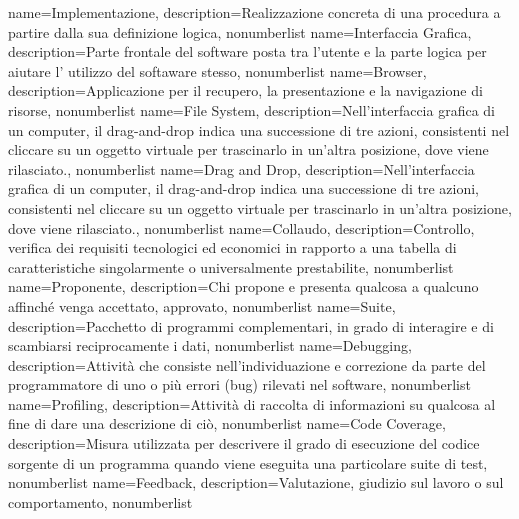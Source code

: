\usepackage{glossaries}
\usepackage[utf8x]{inputenc}
\usepackage[italian]{babel}

\makeglossaries

{
	name={Implementazione},
	description={Realizzazione concreta di una procedura a partire dalla sua definizione logica},
	nonumberlist 
}
{
name={Interfaccia Grafica},
description={Parte frontale del software posta tra l'utente e la parte logica per aiutare l' utilizzo del softaware stesso},
nonumberlist 
}
{
name={Browser},
description={Applicazione per il recupero, la presentazione e la navigazione di risorse},
nonumberlist 
}
{
name={File System},
description={Nell'interfaccia grafica di un computer, il drag-and-drop indica una successione di tre azioni, consistenti nel cliccare su un oggetto virtuale per trascinarlo in un'altra posizione, dove viene rilasciato.},
nonumberlist 
}
{
name={Drag and Drop},
description={Nell'interfaccia grafica di un computer, il drag-and-drop indica una successione di tre azioni, consistenti nel cliccare su un oggetto virtuale per trascinarlo in un'altra posizione, dove viene rilasciato.},
nonumberlist 
}
{
	name={Collaudo},
	description={Controllo, verifica dei requisiti tecnologici ed economici in rapporto a una tabella di caratteristiche singolarmente o universalmente prestabilite},
	nonumberlist 
}
{
	name={Proponente},
	description={Chi propone e presenta qualcosa a qualcuno affinché venga accettato, approvato},
	nonumberlist 
}
{
	name={Suite},
	description={Pacchetto di programmi complementari, in grado di interagire e di scambiarsi reciprocamente i dati},
	nonumberlist 
}
{
	name={Debugging},
	description={Attività che consiste nell'individuazione e correzione da parte del programmatore di uno o più errori (bug) rilevati nel software},
	nonumberlist 
}
{
	name={Profiling},
	description={Attività di raccolta di informazioni su qualcosa al fine di dare una descrizione di ciò},
	nonumberlist 
}
{
	name={Code Coverage},
	description={Misura utilizzata per descrivere il grado di esecuzione del codice sorgente di un programma quando viene eseguita una particolare suite di test},
	nonumberlist 
}
{
	name={Feedback},
	description={Valutazione, giudizio sul lavoro o sul comportamento},
	nonumberlist 
}
